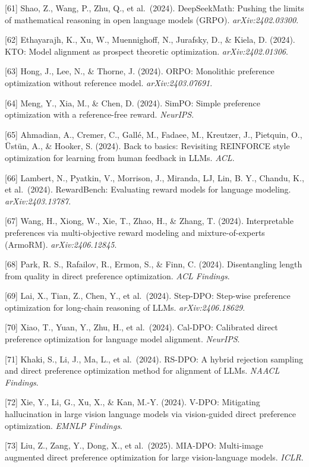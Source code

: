 {[}61{]} Shao, Z., Wang, P., Zhu, Q., et al.~(2024). DeepSeekMath: Pushing the limits of mathematical reasoning in open language models (GRPO). \emph{arXiv:2402.03300}.

{[}62{]} Ethayarajh, K., Xu, W., Muennighoff, N., Jurafsky, D., \& Kiela, D. (2024). KTO: Model alignment as prospect theoretic optimization. \emph{arXiv:2402.01306}.

{[}63{]} Hong, J., Lee, N., \& Thorne, J. (2024). ORPO: Monolithic preference optimization without reference model. \emph{arXiv:2403.07691}.

{[}64{]} Meng, Y., Xia, M., \& Chen, D. (2024). SimPO: Simple preference optimization with a reference-free reward. \emph{NeurIPS}.

{[}65{]} Ahmadian, A., Cremer, C., Gallé, M., Fadaee, M., Kreutzer, J., Pietquin, O., Üstün, A., \& Hooker, S. (2024). Back to basics: Revisiting REINFORCE style optimization for learning from human feedback in LLMs. \emph{ACL}.

{[}66{]} Lambert, N., Pyatkin, V., Morrison, J., Miranda, LJ, Lin, B. Y., Chandu, K., et al.~(2024). RewardBench: Evaluating reward models for language modeling. \emph{arXiv:2403.13787}.

{[}67{]} Wang, H., Xiong, W., Xie, T., Zhao, H., \& Zhang, T. (2024). Interpretable preferences via multi-objective reward modeling and mixture-of-experts (ArmoRM). \emph{arXiv:2406.12845}.

{[}68{]} Park, R. S., Rafailov, R., Ermon, S., \& Finn, C. (2024). Disentangling length from quality in direct preference optimization. \emph{ACL Findings}.

{[}69{]} Lai, X., Tian, Z., Chen, Y., et al.~(2024). Step-DPO: Step-wise preference optimization for long-chain reasoning of LLMs. \emph{arXiv:2406.18629}.

{[}70{]} Xiao, T., Yuan, Y., Zhu, H., et al.~(2024). Cal-DPO: Calibrated direct preference optimization for language model alignment. \emph{NeurIPS}.

{[}71{]} Khaki, S., Li, J., Ma, L., et al.~(2024). RS-DPO: A hybrid rejection sampling and direct preference optimization method for alignment of LLMs. \emph{NAACL Findings}.

{[}72{]} Xie, Y., Li, G., Xu, X., \& Kan, M.-Y. (2024). V-DPO: Mitigating hallucination in large vision language models via vision-guided direct preference optimization. \emph{EMNLP Findings}.

{[}73{]} Liu, Z., Zang, Y., Dong, X., et al.~(2025). MIA-DPO: Multi-image augmented direct preference optimization for large vision-language models. \emph{ICLR}.


